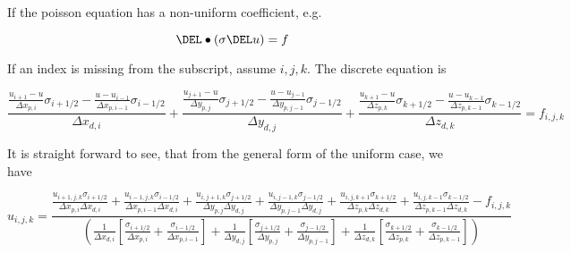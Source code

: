 \documentclass[landscape,11pt]{article}
\begin{document}
If the poisson equation has a non-uniform coefficient, e.g.

\begin{equation}
	\DEL \bullet \left( \sigma \DEL u \right) = f
\end{equation}

If an index is missing from the subscript, assume $i,j,k$. The discrete equation is

\begin{equation}
	\frac{\frac{u_{i+1}-u}{\Delta x_{p,i}} \sigma_{i+1/2} - \frac{u-u_{i-1}}{\Delta x_{p,i-1}} \sigma_{i-1/2}}{\Delta x_{d,i}} +
	\frac{\frac{u_{j+1}-u}{\Delta y_{p,j}} \sigma_{j+1/2} - \frac{u-u_{j-1}}{\Delta y_{p,j-1}} \sigma_{j-1/2}}{\Delta y_{d,j}} +
	\frac{\frac{u_{k+1}-u}{\Delta z_{p,k}} \sigma_{k+1/2} - \frac{u-u_{k-1}}{\Delta z_{p,k-1}} \sigma_{k-1/2}}{\Delta z_{d,k}} = f_{i,j,k}
\end{equation}

It is straight forward to see, that from the general form of the uniform case, we have


\begin{equation}
	u_{i,j,k} =
	\frac{
	\frac{u_{i+1,j,k} \sigma_{i+1/2}}{\Delta x_{p,i} \Delta x_{d,i}} + \frac{u_{i-1,j,k}\sigma_{i-1/2}}{\Delta x_{p,i-1} \Delta x_{d,i}} +
	\frac{u_{i,j+1,k} \sigma_{j+1/2}}{\Delta y_{p,j} \Delta y_{d,j}} + \frac{u_{i,j-1,k}\sigma_{j-1/2}}{\Delta y_{p,j-1} \Delta y_{d,j}} +
	\frac{u_{i,j,k+1} \sigma_{k+1/2}}{\Delta z_{p,k} \Delta z_{d,k}} + \frac{u_{i,j,k-1}\sigma_{k-1/2}}{\Delta z_{p,k-1} \Delta z_{d,k}}
	- f_{i,j,k} }{
	\left(
	\frac{ 1 }{ \Delta x_{d,i} }
	\left[
	\frac{ \sigma_{i+1/2} }{ \Delta x_{p,i} } +
	\frac{ \sigma_{i-1/2} }{ \Delta x_{p,i-1} }
	\right] +
	\frac{ 1 }{ \Delta y_{d,j} }
	\left[
	\frac{ \sigma_{j+1/2} }{ \Delta y_{p,j} } +
	\frac{ \sigma_{j-1/2} }{ \Delta y_{p,j-1} }
	\right] +
	\frac{ 1 }{ \Delta z_{d,k} }
	\left[
	\frac{ \sigma_{k+1/2} }{ \Delta z_{p,k} } +
	\frac{ \sigma_{k-1/2} }{ \Delta z_{p,k-1} }
	\right]
	\right)
	}
\end{equation}
\end{document}
